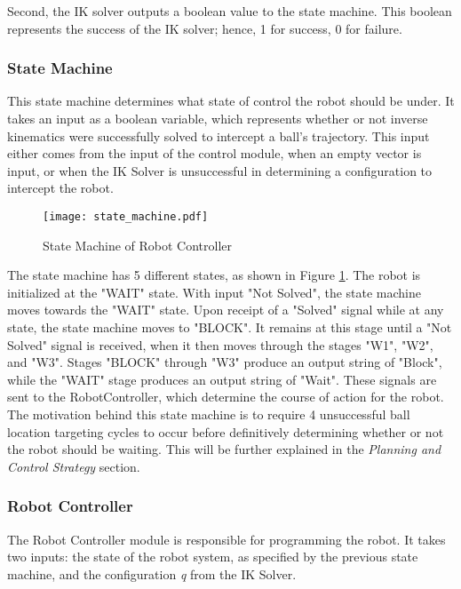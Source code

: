 \documentclass{article}
\begin{document}
Second, the IK solver outputs a boolean value to the state machine. This boolean represents the success of the IK solver; hence, 1 for success, 0 for failure.

\subsubsection*{State Machine} 
This state machine determines what state of control the robot should be under. It takes an input as a boolean variable, which represents whether or not inverse kinematics were successfully solved to intercept a ball's trajectory. This input either comes from the input of the control module, when an empty vector is input, or when the IK Solver is unsuccessful in determining a configuration to intercept the robot. \par 

\begin{figure}[h]
\begin{center}
\texttt{[image: state\_machine.pdf]}
\caption{\label{fig:fsm} State Machine of Robot Controller}
\end{center}
\end{figure}

The state machine has 5 different states, as shown in Figure \ref{fig:fsm}. The robot is initialized at the "WAIT" state. With input "Not Solved", the state machine moves towards the "WAIT" state. Upon receipt of a "Solved" signal while at any state, the state machine moves to "BLOCK". It remains at this stage until a "Not Solved" signal is received, when it then moves through the stages "W1", "W2", and "W3". Stages "BLOCK" through "W3" produce an output string of "Block", while the "WAIT" stage produces an output string of "Wait". These signals are sent to the RobotController, which determine the course of action for the robot. The motivation behind this state machine is to require 4 unsuccessful ball location targeting cycles to occur before definitively determining whether or not the robot should be waiting. This will be further explained in the \emph{Planning and Control Strategy} section. \par 

\subsubsection*{Robot Controller}
The Robot Controller module is responsible for programming the robot. It takes two inputs: the state of the robot system, as specified by the previous state machine, and the configuration \emph{q} from the IK Solver. \par 
\end{document}
